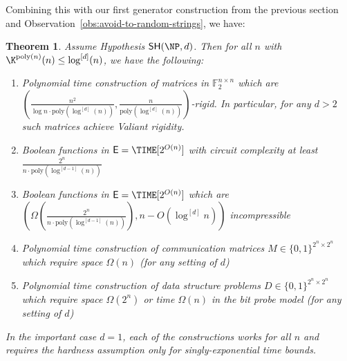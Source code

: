 \documentclass[11pt]{article}
\newtheorem{theorem}{Theorem}
\newcommand{\B}{\{0,1\}}
\newcommand{\SH}{\mathsf{SH}}
\renewcommand{\poly}{\mathrm{poly}}
\begin{document}
Combining this with our first generator construction from the previous section and Observation~\ref{obs:avoid-to-random-strings}, we have:
\begin{theorem}\label{thm:conditional-ecs-strong}
Assume Hypothesis $\SH(\NP,d)$. Then for all $n$ with $\K^{\poly(n)}(n) \leq \log^{[d]}(n)$, we have the following:
\begin{enumerate}
    \item \sloppy Polynomial time construction of matrices in $\mathbb{F}_2^{n \times n}$ which are $(\frac{n^2}{\log n\cdot  \poly(\log^{[d]}(n))}, \frac{n}{\poly(\log^{[d]}(n))})$-rigid. In particular, for any $d > 2$ such matrices achieve Valiant rigidity.
    \item Boolean functions in $\mathsf{E} = \TIME[2^{O(n)}]$ with circuit complexity at least $ \frac{2^n}{n \cdot \poly(\log^{[d-1]}(n))}$
    \item \sloppy Boolean functions in $\mathsf{E} = \TIME[2^{O(n)}]$ which are ${(\Omega(\frac{2^n}{n \cdot \poly(\log^{[d-1]}(n))}), n- O(\log^{[d]}n))}$ incompressible
    \item Polynomial time construction of communication matrices $M \in \B^{2^n \times 2^n}$ which require space $\Omega(n)$ (for any setting of $d$)
    \item Polynomial time construction of data structure problems $D \in \B^{2^n \times 2^n}$ which require space $\Omega(2^n)$ or time $\Omega(n)$ in the bit probe model (for any setting of $d$)
\end{enumerate}
In the important case $d = 1$, each of the constructions works for all $n$ and requires the hardness assumption only for singly-exponential time bounds.
\end{theorem}
\end{document}
